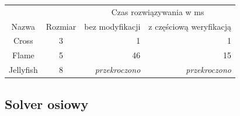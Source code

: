 \begin{center}
    \begin{tabular}{|c|c|r r|}
        \hline
        {}          & {}        & \multicolumn{2}{c|}{Czas rozwiązywania w ms} \\
        Nazwa       & Rozmiar   & bez modyfikacji & z częściową weryfikacją \\
        \hline
        Cross       & 3 & 1                     & 1 \\
        Flame       & 5 & 46                    & 15 \\
        Jellyfish   & 8 & \textit{przekroczono} & \textit{przekroczono} \\
        \hline
    \end{tabular}
\end{center}


\subsection{Solver osiowy}

